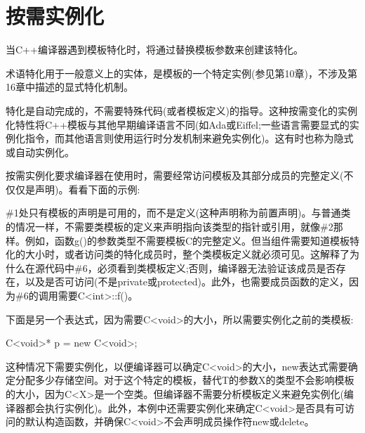 \section{按需实例化}
当C++编译器遇到模板特化时，将通过替换模板参数来创建该特化。

\begin{notice}
术语特化用于一般意义上的实体，是模板的一个特定实例(参见第10章)，不涉及第16章中描述的显式特化机制。
\end{notice}

特化是自动完成的，不需要特殊代码(或者模板定义)的指导。这种按需变化的实例化特性将C++模板与其他早期编译语言不同(如Ada或Eiffel;一些语言需要显式的实例化指令，而其他语言则使用运行时分发机制来避免实例化)。这有时也称为隐式或自动实例化。

按需实例化要求编译器在使用时，需要经常访问模板及其部分成员的完整定义(不仅仅是声明)。看看下面的示例:


\#1处只有模板的声明是可用的，而不是定义(这种声明称为前置声明)。与普通类的情况一样，不需要类模板的定义来声明指向该类型的指针或引用，就像\#2那样。例如，函数g()的参数类型不需要模板C的完整定义。但当组件需要知道模板特化的大小时，或者访问类的特化成员时，整个类模板定义就必须可见。这解释了为什么在源代码中\#6，必须看到类模板定义;否则，编译器无法验证该成员是否存在，以及是否可访问(不是private或protected)。此外，也需要成员函数的定义，因为\#6的调用需要C<int>::f()。

下面是另一个表达式，因为需要C<void>的大小，所以需要实例化之前的类模板:

\begin{cpp}
C<void>* p = new C<void>;
\end{cpp}

这种情况下需要实例化，以便编译器可以确定C<void>的大小，new表达式需要确定分配多少存储空间。对于这个特定的模板，替代T的参数X的类型不会影响模板的大小，因为C<X>是一个空类。但编译器不需要分析模板定义来避免实例化(编译器都会执行实例化)。此外，本例中还需要实例化来确定C<void>是否具有可访问的默认构造函数，并确保C<void>不会声明成员操作符new或delete。

